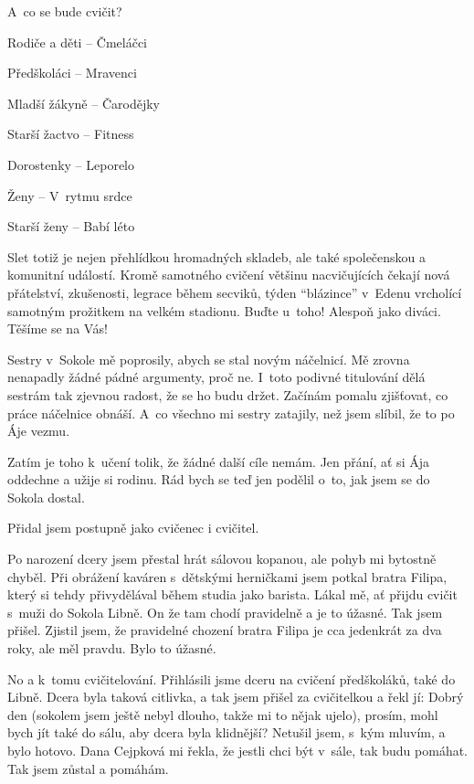 \documentclass[11pt]{article}
\begin{document}
\clearpage
\vspace*{6pt}\noindent
A~co se bude cvičit?

Rodiče a děti –⁠ Čmeláčci

Předškoláci –⁠ Mravenci

Mladší žákyně – Čarodějky

Starší žactvo – Fitness

Dorostenky – Leporelo

Ženy – V~rytmu srdce

Starší ženy – Babí léto
\vspace*{6pt}\noindent

Slet totiž je nejen přehlídkou hromadných skladeb, ale také společenskou a komunitní událostí. Kromě samotného cvičení většinu nacvičujících čekají nová přátelství, zkušenosti, legrace během secviků, týden “blázince” v~Edenu vrcholící samotným prožitkem na velkém stadionu. Buďte u~toho! Alespoň jako diváci. Těšíme se na Vás!

\signature{Alena Krásová (Ája)}{}

\vspace*{24pt}

Sestry v~Sokole mě poprosily, abych se stal novým náčelnicí. Mě zrovna nenapadly žádné pádné argumenty, proč ne. I~toto podivné titulování dělá sestrám tak zjevnou radost, že se ho budu držet. Začínám pomalu zjišťovat, co práce náčelnice obnáší. A~co všechno mi sestry zatajily, než jsem slíbil, že to po Áje vezmu.

Zatím je toho k~učení tolik, že žádné další cíle nemám. Jen přání, ať si Ája oddechne a užije si rodinu. Rád bych se teď jen podělil o~to, jak jsem se do Sokola dostal.

Přidal jsem postupně jako cvičenec i cvičitel.

Po narození dcery jsem přestal hrát sálovou kopanou, ale pohyb mi bytostně chyběl. Při obrážení kaváren s~dětskými herničkami jsem potkal bratra Filipa, který si tehdy přivydělával během studia jako barista. Lákal mě, ať přijdu cvičit s~muži do Sokola Libně. On že tam chodí pravidelně a je to úžasné. Tak jsem přišel. Zjistil jsem, že pravidelné chození bratra Filipa je cca jedenkrát za dva roky, ale měl pravdu. Bylo to úžasné.

No a k~tomu cvičitelování. Přihlásili jsme dceru na cvičení předškoláků, také do Libně. Dcera byla taková citlivka, a tak jsem přišel za cvičitelkou a řekl jí: \luv{}Dobrý den (sokolem jsem ještě nebyl dlouho, takže mi to nějak ujelo), prosím, mohl bych jít také do sálu, aby dcera byla klidnější?\ruv{} Netušil jsem, s~kým mluvím, a bylo hotovo. Dana Cejpková mi řekla, že jestli chci být v~sále, tak budu pomáhat. Tak jsem zůstal a pomáhám.
\end{document}
